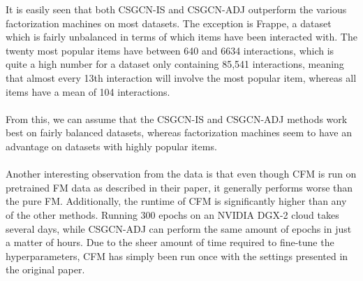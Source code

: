 It is easily seen that both CSGCN-IS and CSGCN-ADJ outperform the various factorization machines on most datasets.
The exception is Frappe, a dataset which is fairly unbalanced in terms of which items have been interacted with. 
The twenty most popular items have between 640 and 6634 interactions, which is quite a high number for a dataset only containing 85,541 interactions, meaning that almost every 13th interaction will involve the most popular item, whereas all items have a mean of 104 interactions.\\\\
From this, we can assume that the CSGCN-IS and CSGCN-ADJ methods work best on fairly balanced datasets, whereas factorization machines seem to have an advantage on datasets with highly popular items.\\\\
Another interesting observation from the data is that even though CFM is run on pretrained FM data as described in their paper, it generally performs worse than the pure FM.
Additionally, the runtime of CFM is significantly higher than any of the other methods.
Running 300 epochs on an NVIDIA DGX-2 cloud takes several days, while CSGCN-ADJ can perform the same amount of epochs in just a matter of hours.
Due to the sheer amount of time required to fine-tune the hyperparameters, CFM has simply been run once with the settings presented in the original paper.



